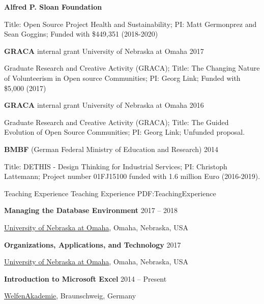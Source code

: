 \documentclass[letterpaper,MMMyyyy,nonstopmode]{simpleresumecv}
\begin{document}
\begin{Body}
\BigGap
\Entry
\textbf{Alfred P. Sloan Foundation}
\hfill 
{}

\begin{Detail}
Title: Open Source Project Health and Sustainability;
PI: Matt Germonprez and Sean Goggins;
Funded with \$449,351 (2018-2020)
\end{Detail}

\BigGap
\Entry
\textbf{GRACA} internal grant University of Nebraska at Omaha
\hfill
2017
\begin{Detail}
Graduate Research and Creative Activity (GRACA);
Title: The Changing Nature of Volunteerism in Open source Communities;
PI: Georg Link;
Funded with \$5,000 (2017)
\end{Detail}

\BigGap
\Entry
\textbf{GRACA} internal grant University of Nebraska at Omaha
\hfill
2016
\begin{Detail}
Graduate Research and Creative Activity (GRACA);
Title: The Guided Evolution of Open Source Communities;
PI: Georg Link;
Unfunded proposal.
\end{Detail}

\BigGap
\Entry
\textbf{BMBF} (German Federal Ministry of Education and Research)
\hfill
2014
\begin{Detail}
Title: DETHIS - Design Thinking for Industrial Services;
PI: Christoph Lattemann;
Project number 01FJ15100 funded with 1.6 million Euro (2016-2019).
\end{Detail}



\Section
{Teaching Experience}
{Teaching Experience}
{PDF:TeachingExperience}

\Entry
\textbf{Managing the Database Environment}
\hfill 
2017 -- 2018
\begin{Detail}
\href{http://unomaha.edu/}
{University of Nebraska at Omaha},
Omaha, Nebraska, USA
\end{Detail}

\BigGap
\Entry
\textbf{Organizations, Applications, and Technology}
\hfill 
2017
\begin{Detail}
\href{http://unomaha.edu/}
{University of Nebraska at Omaha},
Omaha, Nebraska, USA
\end{Detail}

\BigGap
\Entry
\textbf{Introduction to Microsoft Excel}
\hfill
2014 -- Present
\begin{Detail}
\href{http://www.welfenakademie.de/}
{WelfenAkademie},
Braunschweig, Germany
\end{Detail}



\end{Body}
\end{document}
